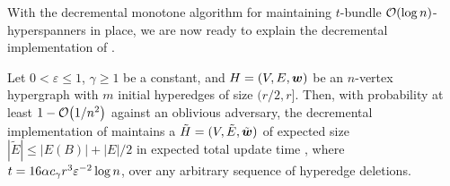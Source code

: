 With the decremental monotone algorithm for maintaining \( t \)-bundle \( \atmost{\log n} \)-hyperspanners in place, we are now ready to explain the decremental implementation of .

\begin{lemma} \label{lem:decremental_light-spectral-sparsify}
Let \( 0 < \varepsilon \leq 1 \),
 \( \gamma \geq 1 \) be a constant, and \( { H} = (V, E, \boldsymbol{w}) \) be an \( n \)-vertex hypergraph with \( m \) initial hyperedges of size \( (r/2, r] \).
Then, with probability at least \( 1 - \atmost{1 /n^2} \) against an oblivious adversary, the decremental implementation of  maintains a \SpectralHypersparsifier{} \( { \tilde H} = (V, \tilde{E}, \tilde{\boldsymbol{w}}) \) of expected size \( |\tilde{E}| \leq |E(B)| + |E| /2 \) in expected total update time , where \( t = 16 \alpha c_{ \gamma } r^3 \varepsilon ^{-2} \log n \), over any arbitrary sequence of  hyperedge deletions.
\end{lemma}
